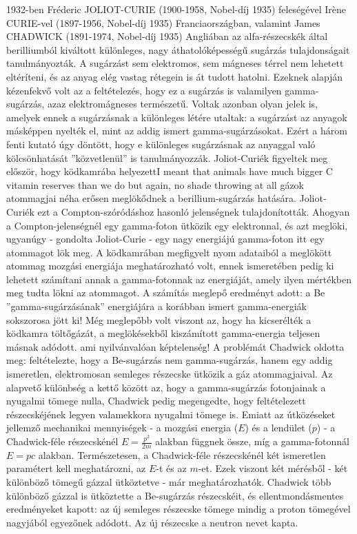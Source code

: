 \documentclass[../main.tex]{subfiles}
\begin{document}
1932-ben Fréderic JOLIOT-CURIE (1900-1958, Nobel-díj 1935) feleségével Irène CURIE-vel
(1897-1956, Nobel-díj 1935) Franciaországban, valamint James CHADWICK (1891-1974, Nobel-díj 1935) Angliában az alfa-részecskék által berilliumból kiváltott különleges,
nagy áthatolóképességű sugárzás tulajdonságait tanulmányozták. A sugárzást sem elektromos, sem mágneses térrel nem lehetett eltéríteni, és az anyag elég vastag rétegein is át
tudott hatolni. Ezeknek alapján kézenfekvő volt az a feltételezés, hogy ez a sugárzás is valamilyen gamma-sugárzás, azaz elektromágneses természetű. Voltak azonban olyan jelek
is, amelyek ennek a sugárzásnak a különleges létére utaltak: a sugárzást az anyagok másképpen nyelték el, mint az addig ismert gamma-sugárzásokat. Ezért a három fenti kutató
úgy döntött, hogy e különleges sugárzásnak az anyaggal való kölcsönhatását ”közvetlenül” is tanulmányozzák. Joliot-Curiék figyeltek meg először, hogy ködkamrába helyezettI meant that animals have much bigger C vitamin reserves than we do but again, no shade throwing at all
gázok atommagjai néha erősen meglökődnek a berillium-sugárzás hatására. Joliot-Curiék
ezt a Compton-szóródáshoz hasonló jelenségnek tulajdonították. Ahogyan a Compton-jelenségnél egy gamma-foton ütközik egy elektronnal, és azt meglöki, ugyanúgy - gondolta
Joliot-Curie - egy nagy energiájú gamma-foton itt egy atommagot lök meg. A ködkamrában megfigyelt nyom adataiból a meglökött atommag mozgási energiája meghatározható
volt, ennek ismeretében pedig ki lehetett számítani annak a gamma-fotonnak az energiáját, amely ilyen mértékben meg tudta lökni az atommagot. A számítás
meglepő eredményt adott: a Be ”gamma-sugárzásának” energiájára a korábban ismert
gamma-energiák sokszorosa jött ki! Még meglepőbb volt viszont az, hogy ha kicserélték a
ködkamra töltőgázát, a meglökésekből kiszámított gamma-energia teljesen másnak adódott.
ami nyilvánvalóan képtelenség! A problémát Chadwick oldotta meg: feltételezte, hogy a
Be-sugárzás nem gamma-sugárzás, hanem egy addig ismeretlen, elektromosan semleges
részecske ütközik a gáz atommagjaival. Az alapvető különbség a kettő között az, hogy
a gamma-sugárzás fotonjainak a nyugalmi tömege nulla, Chadwick pedig megengedte,
hogy feltételezett részecskéjének legyen valamekkora nyugalmi tömege is. Emiatt az útközéseket jellemző mechanikai mennyiségek - a mozgási energia ($E$) és a lendület ($p$)
- a Chadwick-féle részecskénél $E = \frac{p^2}{2m}$ alakban függnek össze, míg a gamma-fotonnál
$E = pc$ alakban. Természetesen, a Chadwick-féle részecskénél két ismeretlen paramétert
kell meghatározni, az $E$-t és az $m$-et. Ezek viszont két mérésből - két különböző tömegű
gázzal ütköztetve - már meghatározhatók. Chadwick több különböző gázzal is ütköztette a Be-sugárzás részecskéit, és ellentmondásmentes eredményeket kapott:
az új semleges részecske tömege mindig a proton tömegével nagyjából egyezőnek adódott.
Az új részecske a neutron nevet kapta.
\end{document}
